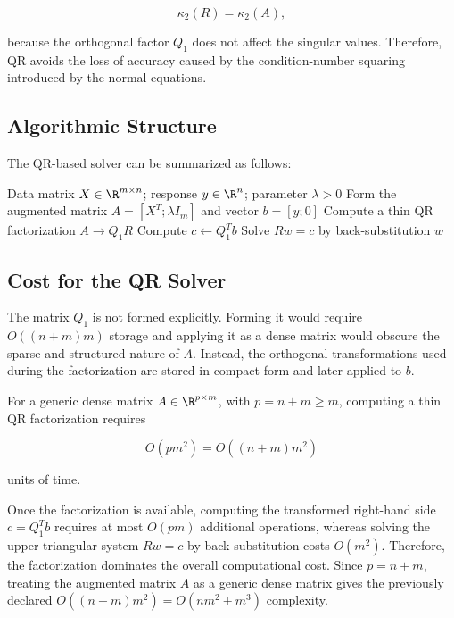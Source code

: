 \begin{equation}
    \kappa_2(R)=\kappa_2(A),
\end{equation}

\noindent because the orthogonal factor $Q_1$ does not affect the singular values.
Therefore, QR avoids the loss of accuracy caused by the condition-number
squaring introduced by the normal equations.

\subsection{Algorithmic Structure}

\noindent The QR-based solver can be summarized as follows:

\begin{algorithm}[H]
\caption{QR Solver for the Regularized Least Squares Problem}
\label{alg:qr_solver}
\begin{algorithmic}[1]
    \Require Data matrix $X\in\R^{m\times n}$; response $y\in\R^n$; parameter $\lambda>0$
    \State Form the augmented matrix $A = [X^T;\lambda I_m]$ and vector $b=[y;0]$
    \State Compute a thin QR factorization $A\rightarrow Q_1R$
    \State Compute $c \gets Q_1^T b$
    \State Solve $Rw=c$ by back-substitution
    \State \Return $w$
\end{algorithmic}
\end{algorithm}

\subsection{Cost for the QR Solver}
\label{sec:qr_cost_project}
\noindent The matrix $Q_1$ is not formed explicitly. Forming it would require $O((n+m)m)$ storage and applying it as a dense matrix would obscure the sparse and structured nature of $A$. Instead, the orthogonal transformations used during the factorization are stored in compact form and later applied to $b$.

\noindent For a generic dense matrix $A\in\R^{p\times m}$, with $p=n+m\geq m$, computing a thin QR factorization requires

\begin{equation}
    O(pm^2) = O((n+m)m^2)
\end{equation}

\noindent units of time.

\noindent Once the factorization is available, computing the transformed right-hand side $c=Q_1^T b$ requires at most $O(pm)$ additional operations, whereas solving the upper triangular system $Rw=c$ by back-substitution costs $O(m^2)$.
Therefore, the factorization dominates the overall computational cost. Since $p=n+m$, treating the augmented matrix $A$ as a generic dense matrix gives the previously declared $O((n+m)m^2) = O(nm^2+m^3)$ complexity.

